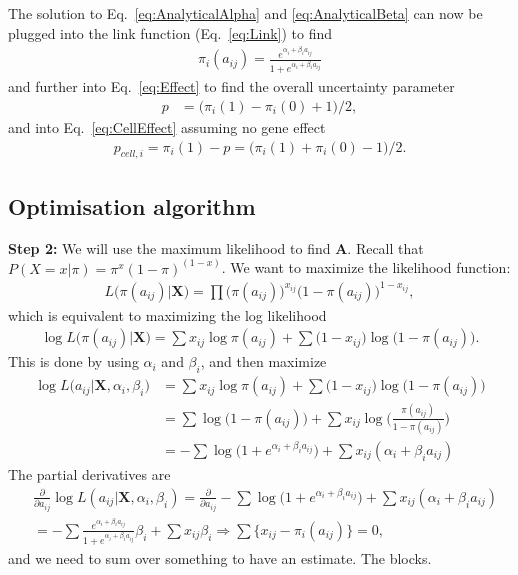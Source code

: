 \documentclass[12pt]{article}
\begin{document}
The solution to Eq.~\ref{eq:AnalyticalAlpha} and \ref{eq:AnalyticalBeta} can now be plugged into the link function (Eq.~\ref{eq:Link}) to find
\begin{align*}
  \pi_{i}(a_{ij}) = \frac{e^{\alpha_{i} + \beta_{i} a_{ij}}}{1 + e^{\alpha_{i} + \beta_{i} a_{ij}}}
\end{align*}
and further into Eq.~\ref{eq:Effect} to find the overall uncertainty parameter
\begin{align*}
 p&  = \big ( \pi_{i}(1) -  \pi_{i}(0) + 1 \big ) / 2,
\end{align*}
and into Eq.~\ref{eq:CellEffect} assuming no gene effect
\begin{align*}
    p_{cell, i} = \pi_{i}(1) - p =  \big ( \pi_{i}(1) +  \pi_{i}(0) - 1 \big ) / 2.
\end{align*}


\subsection{Optimisation algorithm} %

{\bf Step 2:} We will use the maximum likelihood to find $\mathbf{A}$. 
Recall that $P(X = x|\pi) = \pi^x (1 - \pi)^{(1-x)}$.
We want to maximize the likelihood function:
\begin{align}
  L \big (\pi(a_{ij})|\mathbf{X} \big ) =\prod  \big ( \pi(a_{ij}) \big )^{x_{ij}} \big ( 1 - \pi(a_{ij}) \big) ^{1 - x_{ij}},
\end{align}
which is equivalent to maximizing the log likelihood
\begin{align}
  \log L \big (\pi(a_{ij})|\mathbf{X} \big ) =\sum x_{ij} \log  \pi(a_{ij})+ \sum \big (1 - x_{ij} \big)\log  \big ( 1 - \pi(a_{ij}) \big).
\end{align}
This is done by using $\alpha_i$ and $\beta_i$, and then maximize
\begin{align}
  \log L \big (a_{ij}|\mathbf{X}, \alpha_i, \beta_i \big ) & =\sum x_{ij} \log  \pi(a_{ij})+ \sum \big (1 - x_{ij} \big)\log  \big ( 1 - \pi(a_{ij}) \big) \\
  & =\sum \log \big (1 - \pi(a_{ij}) \big )+ \sum  x_{ij}\log  \big ( \frac{\pi(a_{ij})}{1 - \pi(a_{ij})} \big) \\
   & = -\sum \log \big (1 + e^{\alpha_{i} + \beta_{i} a_{ij}} \big )+ \sum  x_{ij}(\alpha_{i} + \beta_{i} a_{ij}) 
\end{align}
The partial derivatives are 
\begin{align}
&  \frac{\partial}{\partial a_{ij}} \log L(a_{ij}|\mathbf{X}, \alpha_i, \beta_i) = \frac{\partial}{\partial a_{ij}} -\sum \log \big (1 + e^{\alpha_{i} + \beta_{i} a_{ij}} \big )+ \sum  x_{ij}(\alpha_{i} + \beta_{i} a_{ij}) \nonumber  \\
&  = - \sum\frac{e^{\alpha_{i} + \beta_{i} a_{ij}}}{1 + e^{\alpha_{i} + \beta_{i} a_{ij}}} \beta_i + \sum x_{ij} \beta_i \Rightarrow \sum \{ x_{ij} - \pi_i(a_{ij}) \} = 0,
\end{align}
and we need to sum over something to have an estimate. 
The blocks.
\end{document}
